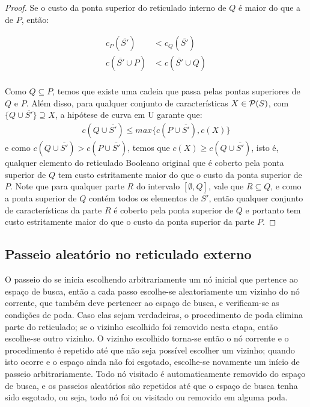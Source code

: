 \begin{proof}
Se o custo da ponta superior do reticulado interno de $Q$ é maior do que
a de $P$, então:

\begin{align*}
    c_P (\overline{S'}) & < c_Q (\overline{S'}) \\
    c (\overline{S'} \cup P) & < c (\overline{S'} \cup Q) \\
\end{align*}

Como $Q \subseteq P$, temos que existe uma cadeia que passa pelas pontas
superiores de $Q$ e $P$. Além disso, para qualquer conjunto de 
características $X \in \mathcal{P} (S)$, com $\{Q \cup \overline{S'}\}\supseteq X$, a hipótese 
de curva em U garante que:
\begin{align*}
    c (Q \cup \overline{S'}) \leq max \{c (P \cup \overline{S'}), c (X)\}
\end{align*}
e como $c (Q \cup \overline{S'}) > c (P \cup \overline{S'})$, temos que 
$c (X) \geq c (Q \cup \overline{S'})$, isto é, qualquer elemento do reticulado Booleano 
original que é coberto pela ponta superior de $Q$ tem custo estritamente maior 
do que o custo da ponta superior de $P$. Note que para qualquer parte 
$R$ do intervalo $[\emptyset, Q]$, vale que $R \subseteq Q$, e como 
a ponta superior de $Q$ contém todos os elementos de $\overline {S'}$, 
então qualquer conjunto de características da parte $R$ é coberto pela 
ponta superior de $Q$ e portanto tem custo estritamente maior do que o 
custo da ponta superior da parte $P$.
\end{proof}

\subsection{Passeio aleatório no reticulado externo}
O passeio do  se inicia escolhendo arbitrariamente um nó 
inicial que pertence ao espaço de busca, então a cada passo escolhe-se 
aleatoriamente um vizinho do nó corrente, que também deve pertencer ao 
espaço de busca, e verificam-se as condições de poda. Caso elas sejam 
verdadeiras, o procedimento de poda elimina parte do reticulado; se o 
vizinho escolhido foi removido nesta etapa, então escolhe-se outro 
vizinho. O vizinho escolhido torna-se então o nó corrente e o 
procedimento é repetido até que não seja possível escolher um vizinho; 
quando isto ocorre e o espaço ainda não foi esgotado, escolhe-se 
novamente um início de passeio arbitrariamente. Todo nó visitado é 
automaticamente removido do espaço de busca, e os passeios aleatórios
são repetidos até que o espaço de busca tenha sido esgotado, ou seja,
todo nó foi ou visitado ou removido em alguma poda.

